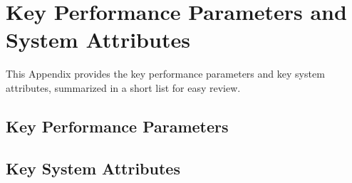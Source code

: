 
\chapter{Key Performance Parameters and System Attributes}
\label{lab:chap_Bspec}

This Appendix provides the key performance parameters and key system attributes, summarized in a short list for easy review.

\KNEADSECTIONNEWPAGE
\section{Key Performance Parameters}
\label{lab:sec_Bspec_KPP}



\newpage
\section{Key System Attributes}
\label{lab:sec_Bspec_KSA}

